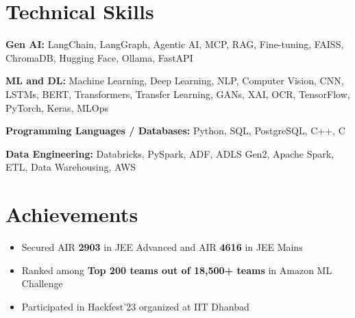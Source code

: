 \documentclass[a4paper,10pt]{article}
\begin{document}
\section{Technical Skills}

\small
\textbf{Gen AI:}
LangChain, LangGraph, Agentic AI, MCP, RAG, Fine-tuning, FAISS, ChromaDB, Hugging Face, Ollama, FastAPI

\vspace{2pt}

\textbf{ML and DL:}
Machine Learning, Deep Learning, NLP, Computer Vision, CNN, LSTMs, BERT, Transformers, Transfer Learning, GANs, XAI, OCR, TensorFlow, PyTorch, Keras, MLOps

\vspace{2pt}

\textbf{Programming Languages / Databases:}
Python, SQL, PostgreSQL, C++, C

\vspace{2pt}

\textbf{Data Engineering:}
Databricks, PySpark, ADF, ADLS Gen2, Apache Spark, ETL, Data Warehousing, AWS

\section{Achievements}

\begin{itemize}[leftmargin=0.18in,itemsep=2pt]
\item Secured AIR \textbf{2903} in JEE Advanced and AIR \textbf{4616} in JEE Mains
\item Ranked among \textbf{Top 200 teams out of 18,500+ teams} in Amazon ML Challenge
\item Participated in Hackfest'23 organized at IIT Dhanbad
\end{itemize}
\end{document}
